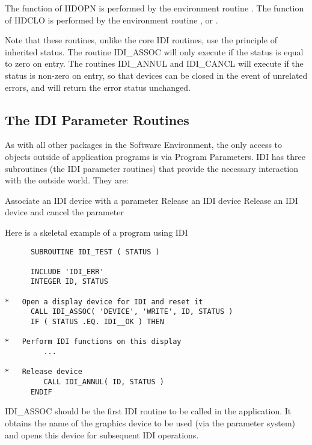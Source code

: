 The function of IIDOPN is performed by the environment routine
.
The function of IIDCLO is performed by the environment routine
,
or .

Note that these routines, unlike the core IDI routines, use the principle
of inherited status. The routine IDI\_ASSOC will only execute if the
status is equal to zero on entry. The routines IDI\_ANNUL and IDI\_CANCL
will execute if the status is non-zero on entry, so that devices can be
closed in the event of unrelated errors, and will return the error
status unchanged.

\subsection{The IDI Parameter Routines}

As with all other packages in the Software Environment, the only access to
objects outside of application programs is via Program Parameters. IDI has
three subroutines (the IDI parameter routines) that provide the
necessary interaction with the outside world. They are:

\begin{routinelist}
{Associate an IDI device with a parameter}
{Release an IDI device}
{Release an IDI device and cancel the parameter}
\end{routinelist}

Here is a skeletal example of a program using IDI
\begin{small}
\begin{verbatim}
      SUBROUTINE IDI_TEST ( STATUS )

      INCLUDE 'IDI_ERR'
      INTEGER ID, STATUS

*   Open a display device for IDI and reset it
      CALL IDI_ASSOC( 'DEVICE', 'WRITE', ID, STATUS )
      IF ( STATUS .EQ. IDI__OK ) THEN

*   Perform IDI functions on this display
         ...

*   Release device
         CALL IDI_ANNUL( ID, STATUS )
      ENDIF
\end{verbatim}
\end{small}

IDI\_ASSOC should be the first IDI routine to be called in the application.
It obtains the name of the graphics device to be used (via the parameter
system) and opens this device for subsequent IDI operations.

